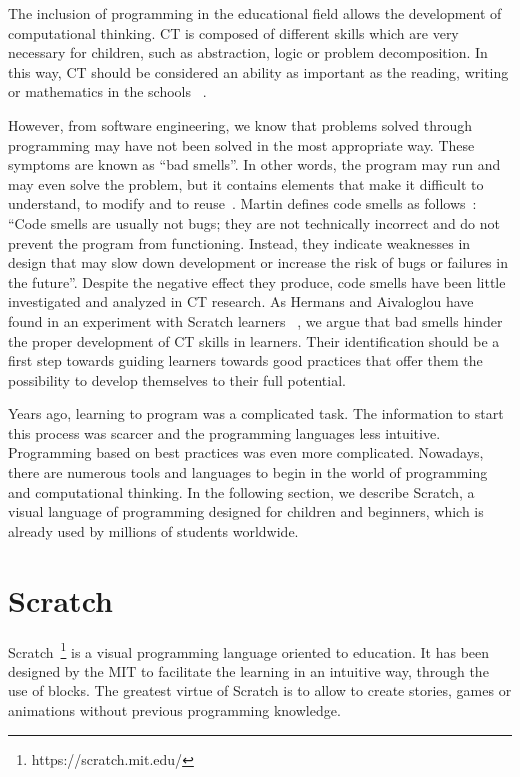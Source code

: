 The inclusion of programming in the educational field allows the development of computational thinking. CT is composed of different skills which are very necessary for children, such as abstraction, logic or problem decomposition. In this way, CT should be considered an ability as important as the reading, writing or mathematics in the schools ~\cite{calao:_design}.

However, from software engineering, we know that problems solved through programming may have not been solved in the most appropriate way. These symptoms are known as ``bad smells''. In other words, the program may run and may even solve the problem, but it contains elements that make it difficult to understand, to modify and to reuse~\cite{zhang:_badsmells}. Martin defines code smells as follows~\cite{martin:_clean}: ``Code smells are usually not bugs; they are not technically incorrect and do not prevent the program from functioning. Instead, they indicate weaknesses in design that may slow down development or increase the risk of bugs or failures in the future''. Despite the negative effect they produce, code smells have been little investigated and analyzed in CT research. As Hermans and Aivaloglou have found in an experiment with Scratch learners ~\cite{felienne:_hamper}, we argue that bad smells hinder the proper development of CT skills in learners. Their identification should be a first step towards guiding learners towards good practices that offer them the possibility to develop themselves to their full potential.

Years ago, learning to program was a complicated task. The information to start this process was scarcer and the programming languages less intuitive. Programming based on best practices was even more complicated. Nowadays, there are numerous tools and languages to begin in the world of programming and computational thinking. In the following section, we describe Scratch, a visual language of programming designed for children and beginners, which is already used by millions of students worldwide.


\section{Scratch}
\label{sec:scratch}

Scratch~\footnote{https://scratch.mit.edu/} is a visual programming language oriented to education. It has been designed by the MIT to facilitate the learning in an intuitive way, through the use of blocks. The greatest virtue of Scratch is to allow to create stories, games or animations without previous programming knowledge.

